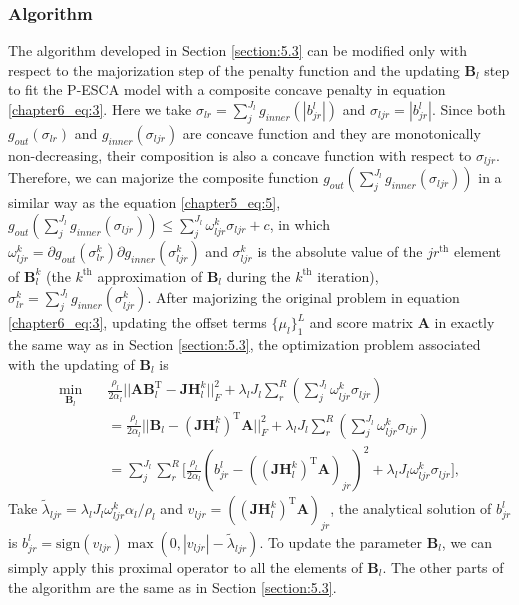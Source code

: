 \subsubsection{Algorithm}
The algorithm developed in Section \ref{section:5.3} can be modified only with respect to the majorization step of the penalty function and the updating $\mathbf{B}_l$ step to fit the P-ESCA model with a composite concave penalty in equation \ref{chapter6_eq:3}. Here we take $\sigma_{lr} = \sum_{j}^{J_l} g_{inner}(|b_{jr}^l|)$ and $\sigma_{ljr} = |b_{jr}^l|$. Since both $g_{out}(\sigma_{lr})$ and $g_{inner}(\sigma_{ljr})$ are concave function and they are monotonically non-decreasing, their composition is also a concave function with respect to $\sigma_{ljr}$. Therefore, we can majorize the composite function $g_{out}(\sum_{j}^{J_l} g_{inner}(\sigma_{ljr}))$ in a similar way  as the equation \ref{chapter5_eq:5}, $g_{out}(\sum_{j}^{J_l} g_{inner}(\sigma_{ljr})) \leq \sum_{j}^{J_l} \omega_{ljr}^k \sigma_{ljr} + c$, in which $\omega_{ljr}^k = \partial g_{out}(\sigma_{lr}^k) \partial g_{inner}(\sigma_{ljr}^k)$ and $\sigma_{ljr}^k$ is the absolute value of the $jr^{\text{th}}$ element of $\mathbf{B}_l^k$ (the $k^{\text{th}}$ approximation of $\mathbf{B}_l$ during the $k^{\text{th}}$ iteration), $\sigma_{lr}^k = \sum_{j}^{J_l} g_{inner}(\sigma_{ljr}^k)$. After majorizing the original problem in equation \ref{chapter6_eq:3}, updating the offset terms $\{\mu_l \}_1^L$ and score matrix $\mathbf{A}$ in exactly the same way as in Section \ref{section:5.3}, the optimization problem associated with the updating of $\mathbf{B}_l$ is
\begin{equation*}
\begin{aligned}
    \min_{\mathbf{B}_l} \quad & \frac{\rho_l}{2\alpha_l} ||\mathbf{AB}_l^{\text{T}} - \mathbf{JH}_{l}^{k}||_F^2  + \lambda_l J_l \sum_{r}^{R} (\sum_{j}^{J_l} \omega_{ljr}^k \sigma_{ljr}) \\
	&= \frac{\rho_l}{2\alpha_l}||\mathbf{B}_l - (\mathbf{JH}_{l}^{k})^{\text{T}} \mathbf{A}||_F^2 + \lambda_l J_l \sum_{r}^{R} (\sum_{j}^{J_l} \omega_{ljr}^k \sigma_{ljr})\\
    &= \sum_{j}^{J_l} \sum_{r}^R \Big[ \frac{\rho_l}{2\alpha_l}(b_{jr}^l - ((\mathbf{JH}_{l}^{k})^{\text{T}} \mathbf{A})_{jr})^2 + \lambda_l J_l \omega_{ljr}^k \sigma_{ljr} \Big],
\end{aligned}
\end{equation*}
Take $\tilde{\lambda}_{ljr} = \lambda_l J_l \omega_{ljr}^k \alpha_l/\rho_l$ and $v_{ljr} = ((\mathbf{JH}_{l}^{k})^{\text{T}} \mathbf{A})_{jr}$, the analytical solution of $b_{jr}^{l}$ is $b_{jr}^{l} = \text{sign}(v_{ljr}) \max(0, |v_{ljr}| -\tilde{\lambda}_{ljr})$. To update the parameter $\mathbf{B}_l$, we can simply apply this proximal operator to all the elements of $\mathbf{B}_l$. The other parts of the algorithm are the same as in Section \ref{section:5.3}.

